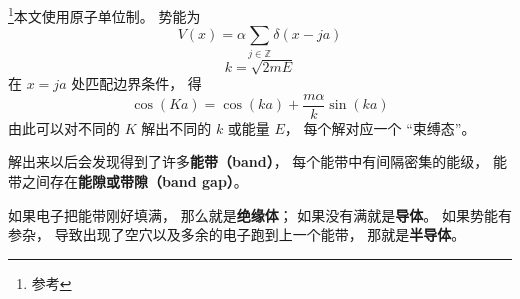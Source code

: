 
\begin{issues}
\issueDraft
\end{issues}


\footnote{参考\cite{GriffQ}}本文使用原子单位制。 势能为
\begin{equation}
V(x) = \alpha \sum_{j\in \mathbb Z} \delta(x - ja)
\end{equation}
\begin{equation}
k = \sqrt{2mE}
\end{equation}
在 $x = ja$ 处匹配边界条件， 得
\begin{equation}
\cos(K a) = \cos(ka) + \frac{m\alpha}{k}\sin(ka)
\end{equation}
由此可以对不同的 $K$ 解出不同的 $k$ 或能量 $E$， 每个解对应一个 “束缚态”。

解出来以后会发现得到了许多\textbf{能带（band）}， 每个能带中有间隔密集的能级， 能带之间存在\textbf{能隙或带隙（band gap）}。

如果电子把能带刚好填满， 那么就是\textbf{绝缘体}； 如果没有满就是\textbf{导体}。 如果势能有参杂， 导致出现了空穴以及多余的电子跑到上一个能带， 那就是\textbf{半导体}。
